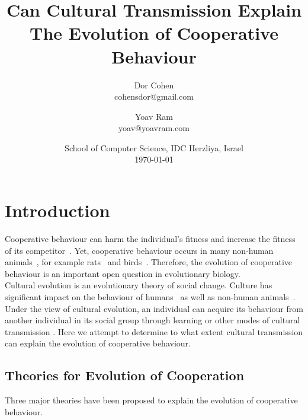 \documentclass{article}
\title{Can Cultural Transmission Explain The Evolution of Cooperative Behaviour}
\author{Dor Cohen \\ cohensdor@gmail.com \and Yoav Ram \\ yoav@yoavram.com}
\date{School of Computer Science, IDC Herzliya, Israel\\ \today}
\begin{document}
\maketitle

\section*{Introduction}
Cooperative behaviour can harm the individual's fitness and increase the fitness of its competitor~\cite{axelrod1981evolution}.
Yet, cooperative behaviour occurs in many non-human animals~\cite{dugatkin1997cooperation}, for example rats~\cite{rice1962altruism} and birds~\cite{krams2008experimental}.
Therefore, the evolution of cooperative behaviour is an important open question in evolutionary biology.
\\
Cultural evolution is an evolutionary theory of social change.
Culture has significant impact on the behaviour of humans~\cite{ihara2004cultural,jeong2018bronze} as well as non-human animals~\cite{bonner2018evolution}.
Under the view of cultural evolution, an individual can acquire its behaviour from another individual in its social group through learning or other modes of cultural transmission \cite{richerson2008not}.
Here we attempt to determine to what extent cultural transmission can explain the evolution of cooperative behaviour.

\subsection*{Theories for Evolution of Cooperation}
Three major theories have been proposed to explain the evolution of cooperative behaviour.
\end{document}
